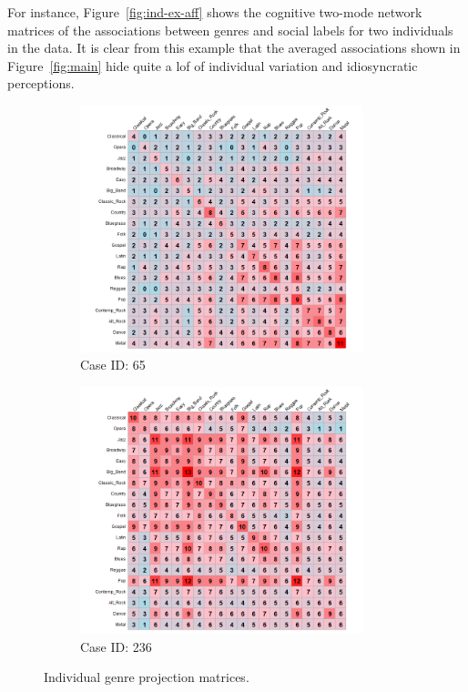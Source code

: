 \documentclass[12pt]{article}
\begin{document}
For instance, Figure~\ref{fig:ind-ex-aff} shows the cognitive two-mode network matrices of the associations between genres and social labels for two individuals in the data. It is clear from this example that the averaged associations shown in Figure~\ref{fig:main} hide quite a lof of individual variation and idiosyncratic perceptions. 

\begin{figure}[ht!]
    \captionsetup[subfigure]{font=footnotesize,labelfont=footnotesize}
    \centering
     \begin{subfigure}[b]{0.49\textwidth}
        \includegraphics[trim={1cm 0cm 0cm 0cm},clip, width=0.9\textwidth]{Plots/data-ex-rp1.png}
            \caption{Case ID: 65}
            \label{fig:ind-ex-rp1}
    \end{subfigure}
     \begin{subfigure}[b]{0.49\textwidth}
        \includegraphics[trim={1cm 0cm 0cm 0cm},clip, width=0.9\textwidth]{Plots/data-ex-rp2.png}
            \caption{Case ID: 236}
            \label{fig:ind-ex-rp2}
    \end{subfigure}
    \caption{Individual genre projection matrices.}
    \label{fig:ind-ex-rp}
\end{figure}
\end{document}
